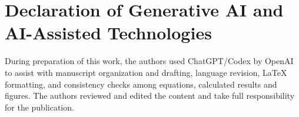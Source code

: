 \section*{Declaration of Generative AI and AI-Assisted Technologies}
During preparation of this work, the authors used ChatGPT/Codex by OpenAI to assist with manuscript organization and drafting, language revision, LaTeX formatting, and consistency checks among equations, calculated results and figures.
The authors reviewed and edited the content and take full responsibility for the publication.
